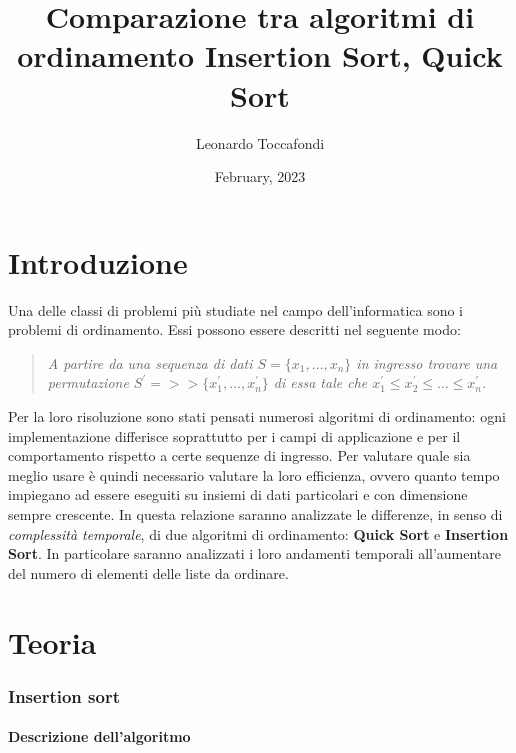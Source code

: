 \documentclass[
]{article}
\title{Comparazione tra algoritmi di ordinamento Insertion Sort, Quick
Sort}
\author{Leonardo Toccafondi}
\date{February, 2023}
\begin{document}
\maketitle

\hypertarget{introduzione}{%
\section{Introduzione}\label{introduzione}}

Una delle classi di problemi più studiate nel campo dell'informatica
sono i problemi di ordinamento. Essi possono essere descritti nel
seguente modo:

\begin{quote}
\emph{A partire da una sequenza di dati \(S = \{x_1, \dotsc, x_n\}\) in
ingresso trovare una permutazione
\(S^{\prime} = > > \{x_1^{\prime}, \dotsc , x_n^{\prime}\}\) di essa
tale che
\(x_1^{\prime} \leq x_2^{\prime} \leq \dotsc \leq x_n^\prime\).}
\end{quote}

Per la loro risoluzione sono stati pensati numerosi algoritmi di
ordinamento: ogni implementazione differisce soprattutto per i campi di
applicazione e per il comportamento rispetto a certe sequenze di
ingresso. Per valutare quale sia meglio usare è quindi necessario
valutare la loro efficienza, ovvero quanto tempo impiegano ad essere
eseguiti su insiemi di dati particolari e con dimensione sempre
crescente. In questa relazione saranno analizzate le differenze, in
senso di \emph{complessità temporale}, di due algoritmi di ordinamento:
\textbf{Quick Sort} e \textbf{Insertion Sort}. In particolare saranno
analizzati i loro andamenti temporali all'aumentare del numero di
elementi delle liste da ordinare.

\hypertarget{teoria}{%
\section{Teoria}\label{teoria}}

\hypertarget{insertion-sort}{%
\subsubsection{Insertion sort}\label{insertion-sort}}

\hypertarget{descrizione-dellalgoritmo}{%
\paragraph{Descrizione dell'algoritmo}\label{descrizione-dellalgoritmo}}
\end{document}
